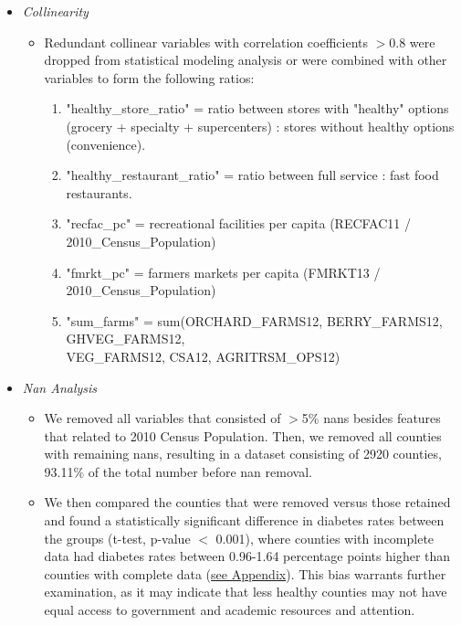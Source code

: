 \documentclass{article}
\begin{document}
\begin{itemize}[leftmargin=0pt]
\begin{itemize}
\item[] \textit{Collinearity}
\begin{itemize}
    \item[] Redundant collinear variables with correlation coefficients $>$0.8 were dropped from statistical modeling analysis or were combined with other variables to form the following ratios: 

    \begin{enumerate}
        \item "healthy\_store\_ratio" = ratio between stores with "healthy" options (grocery + specialty + supercenters) : stores without healthy options (convenience).
        \item "healthy\_restaurant\_ratio" = ratio between full service : fast food restaurants. 
        \item "recfac\_pc" = recreational facilities per capita (RECFAC11 / 2010\_Census\_Population) 
        \item "fmrkt\_pc" = farmers markets per capita (FMRKT13 / 2010\_Census\_Population)
        \item "sum\_farms" = sum(ORCHARD\_FARMS12, BERRY\_FARMS12, GHVEG\_FARMS12,\\ VEG\_FARMS12, CSA12, AGRITRSM\_OPS12) 
    \end{enumerate}
\end{itemize}

\item[] \textit{Nan Analysis}
\begin{itemize}
    \item[] We removed all variables that consisted of $>$5\% nans besides features that related to 2010 Census Population. Then, we removed all counties with remaining nans, resulting in a dataset consisting of 2920 counties, 93.11\% of the total number before nan removal. 
    \item[] We then compared the counties that were removed versus those retained and found a statistically significant difference in diabetes rates between the groups (t-test, p-value $<$ 0.001), where counties with incomplete data had diabetes rates between 0.96-1.64 percentage points higher than counties with complete data (\hyperref[fig:nan_bias]{see Appendix}). This bias warrants further examination, as it may indicate that less healthy counties may not have equal access to government and academic resources and attention.
\end{itemize}


\end{itemize}
\end{itemize}
\end{document}
